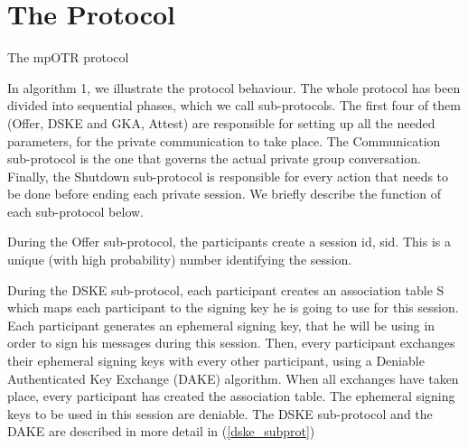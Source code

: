 \documentclass[]{article}
\begin{document}
\section{The Protocol}
\begin{algorithm}[h]
	\caption{The mpOTR protocol}
	\label{mpotr_algo}
\end{algorithm}

In algorithm 1, we illustrate the protocol behaviour.
The whole protocol has been divided into sequential phases, which we call sub-protocols.
The first four of them (Offer, DSKE and GKA, Attest) are responsible for setting up all the needed parameters, for the private communication to take place.
The Communication sub-protocol is the one that governs the actual private group conversation.
Finally, the Shutdown sub-protocol is responsible for every action that needs to be done before ending each private session.
We briefly describe the function of each sub-protocol below.

During the Offer sub-protocol, the participants create a session id, sid.
This is a unique (with high probability) number identifying the session.

During the DSKE sub-protocol, each participant creates an association table S which maps each participant to the signing key he is going to use for this session.
Each participant generates an ephemeral signing key, that he will be using in order to sign his messages during this session.
Then, every participant exchanges their ephemeral signing keys with every other participant, using a Deniable Authenticated Key Exchange (DAKE) algorithm.
When all exchanges have taken place, every participant has created the association table.
The ephemeral signing keys to be used in this session are deniable.
The DSKE sub-protocol and the DAKE are described in more detail in (\ref{dske_subprot})
\end{document}
